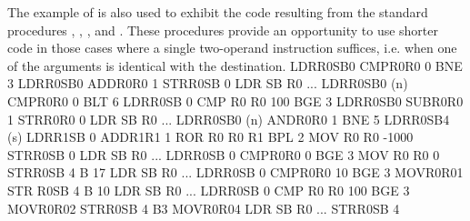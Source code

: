 The example of  is also used to exhibit the code resulting from the standard procedures , , , and . These procedures provide an opportunity to use shorter code in those cases where a single two-operand instruction suffices, i.e. when one of the arguments is identical with the destination.
\begintt
LDRR0SB0
CMPR0R0 0
BNE 3
LDRR0SB0
ADDR0R0 1
STRR0SB 0
LDR SB R0 ...
LDRR0SB0 (n)
CMPR0R0 0
BLT 6
LDRR0SB 0
CMP R0 R0 100
BGE 3
LDRR0SB0
SUBR0R0 1
STRR0R0 0
LDR SB R0 ...
LDRR0SB0 (n)
ANDR0R0 1
BNE 5
LDRR0SB4 (s)
LDRR1SB 0
ADDR1R1 1
ROR R0 R0 R1
BPL 2
MOV R0 R0 -1000
STRR0SB 0
LDR SB R0 ...
LDRR0SB 0
CMPR0R0 0
BGE 3
MOV R0 R0 0 {}
STRR0SB 4
B 17
LDR SB R0 ...
LDRR0SB 0
CMPR0R0 10
BGE 3 MOVR0R01
STR R0SB 4
B 10
LDR SB R0 ...
LDRR0SB 0
CMP R0 R0 100
BGE 3
MOVR0R02
STRR0SB 4 B3
MOVR0R04
LDR SB R0 ...
STRR0SB 4
\endtt


